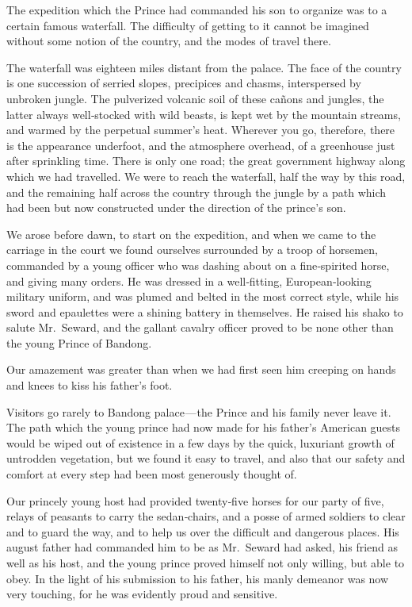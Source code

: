 \documentclass[12pt]{book}
\begin{document}
The expedition which the Prince had commanded his son to organize was
to a certain famous waterfall. The difficulty of getting to it cannot be imagined
without some notion of the country, and the modes of travel there.

The waterfall was eighteen miles distant from the palace. The face of the
country is one succession of serried slopes, precipices and chasms, interspersed
by unbroken jungle. The pulverized volcanic soil of these cañons and jungles, the
latter always well‐stocked with wild beasts, is kept wet by the mountain streams,
and warmed by the perpetual summer’s heat. Wherever you go, therefore, there
is the appearance underfoot, and the atmosphere overhead, of a greenhouse just
after sprinkling time. There is only one road; the great government highway
along which we had travelled. We were to reach the waterfall, half the way by
this road, and the remaining half across the country through the jungle by a path
which had been but now constructed under the direction of the prince’s son.

We arose before dawn, to start on the expedition, and when we came to the
carriage in the court we found ourselves surrounded by a troop of horsemen,
commanded by a young officer who was dashing about on a fine‐spirited horse,
and giving many orders. He was dressed in a well‐fitting, European‐looking
military uniform, and was plumed and belted in the most correct style, while his
sword and epaulettes were a shining battery in themselves. He raised his shako
to salute Mr.~Seward, and the gallant cavalry officer proved to be none other than
the young Prince of Bandong.

Our amazement was greater than when we had first seen him creeping on
hands and knees to kiss his father’s foot.

Visitors go rarely to Bandong palace — the Prince and his family never leave it.
The path which the young prince had now made for his father’s American guests
would be wiped out of existence in a few days by the quick, luxuriant growth of
untrodden vegetation, but we found it easy to travel, and also that our safety and
comfort at every step had been most generously thought of.

Our princely young host had provided twenty‐five horses for our party of
five, relays of peasants to carry the sedan‐chairs, and a posse of armed soldiers to
clear and to guard the way, and to help us over the difficult and dangerous places.
His august father had commanded him to be as Mr.~Seward had asked, his friend
as well as his host, and the young prince proved himself not only willing, but able
to obey. In the light of his submission to his father, his manly demeanor was now
very touching, for he was evidently proud and sensitive.
\end{document}
